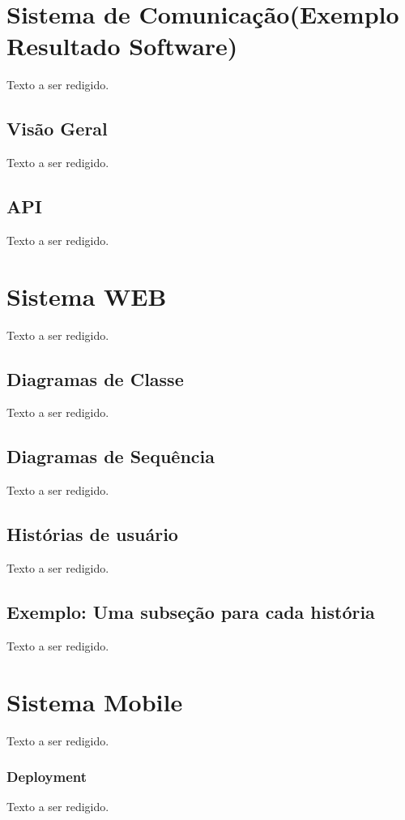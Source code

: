 \section{Sistema de Comunicação(Exemplo Resultado Software)}
Texto a ser redigido.
\subsection{Visão Geral}
Texto a ser redigido.
			\subsection{API}
			Texto a ser redigido.
			
\section{Sistema WEB}
Texto a ser redigido.
\subsection{Diagramas de Classe}
Texto a ser redigido.
\subsection{Diagramas de Sequência}
Texto a ser redigido.
\subsection{Histórias de usuário}
Texto a ser redigido.
\subsection{Exemplo: Uma subseção para cada história}
Texto a ser redigido.
\section{Sistema Mobile}
Texto a ser redigido.
\subsubsection{Deployment}
Texto a ser redigido.